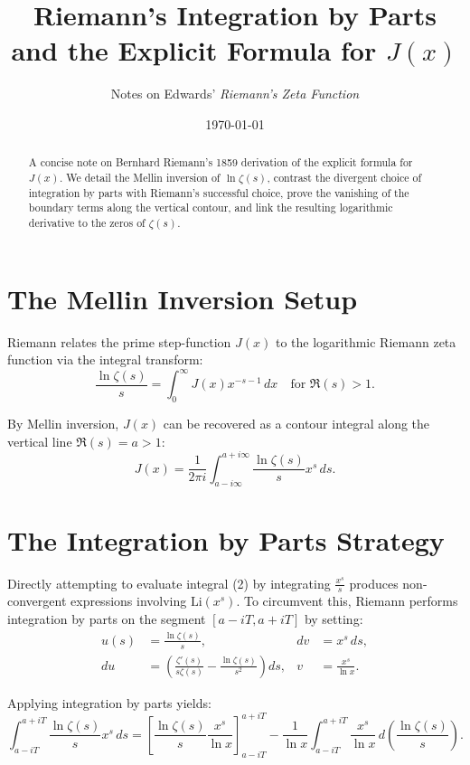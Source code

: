 \documentclass[11pt,a4paper]{article}
\title{\textbf{Riemann's Integration by Parts and the Explicit Formula for $J(x)$}}
\author{Notes on Edwards' \textit{Riemann's Zeta Function}}
\date{\today}
\theoremstyle{definition}
\begin{document}
	
	\maketitle
	
	\begin{abstract}
		A concise note on Bernhard Riemann's 1859 derivation of the explicit formula for $J(x)$. We detail the Mellin inversion of $\ln \zeta(s)$, contrast the divergent choice of integration by parts with Riemann's successful choice, prove the vanishing of the boundary terms along the vertical contour, and link the resulting logarithmic derivative to the zeros of $\zeta(s)$.
	\end{abstract}
	
	\section{The Mellin Inversion Setup}
	
	Riemann relates the prime step-function $J(x)$ to the logarithmic Riemann zeta function via the integral transform:
	\begin{equation}
		\frac{\ln \zeta(s)}{s} = \int_{0}^{\infty} J(x) x^{-s-1} \, dx \quad \text{for } \Re(s) > 1.
	\end{equation}
	
	By Mellin inversion, $J(x)$ can be recovered as a contour integral along the vertical line $\Re(s) = a > 1$:
	\begin{equation}
		J(x) = \frac{1}{2\pi i} \int_{a - i\infty}^{a + i\infty} \frac{\ln \zeta(s)}{s} x^s \, ds.
	\end{equation}
	
	\section{The Integration by Parts Strategy}
	
	Directly attempting to evaluate integral (2) by integrating $\frac{x^s}{s}$ produces non-convergent expressions involving $\mathrm{Li}(x^s)$. To circumvent this, Riemann performs integration by parts on the segment $[a - iT, a + iT]$ by setting:
	\begin{align*}
		u(s) &= \frac{\ln \zeta(s)}{s}, & dv &= x^s \, ds, \\[1ex]
		du &= \left( \frac{\zeta'(s)}{s \zeta(s)} - \frac{\ln \zeta(s)}{s^2} \right) ds, & v &= \frac{x^s}{\ln x}.
	\end{align*}
	
	Applying integration by parts yields:
	\begin{equation}
		\int_{a - iT}^{a + iT} \frac{\ln \zeta(s)}{s} x^s \, ds = \left[ \frac{\ln \zeta(s)}{s} \frac{x^s}{\ln x} \right]_{a - iT}^{a + iT} - \frac{1}{\ln x} \int_{a - iT}^{a + iT} \frac{x^s}{\ln x} \, d\left( \frac{\ln \zeta(s)}{s} \right).
	\end{equation}
	
\end{document}
